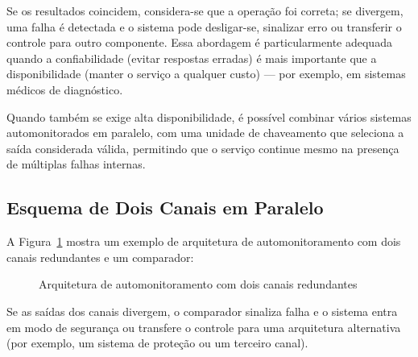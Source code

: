 \documentclass[12pt,a4paper]{report}
\begin{document}
Se os resultados coincidem, considera-se que a operação foi correta; se
divergem, uma falha é detectada e o sistema pode desligar-se, sinalizar
erro ou transferir o controle para outro componente. Essa abordagem é
particularmente adequada quando a confiabilidade (evitar respostas erradas)
é mais importante que a disponibilidade (manter o serviço a qualquer custo)
— por exemplo, em sistemas médicos de diagnóstico.

Quando também se exige alta disponibilidade, é possível combinar vários
sistemas automonitorados em paralelo, com uma unidade de chaveamento que
seleciona a saída considerada válida, permitindo que o serviço continue
mesmo na presença de múltiplas falhas internas.

\subsection{Esquema de Dois Canais em Paralelo}

A Figura~\ref{fig:automonitoramento} mostra um exemplo de arquitetura de
automonitoramento com dois canais redundantes e um comparador:

\begin{figure}[h]
    \centering
    \caption{Arquitetura de automonitoramento com dois canais redundantes}
    \label{fig:automonitoramento}
\end{figure}

Se as saídas dos canais divergem, o comparador sinaliza falha e o sistema
entra em modo de segurança ou transfere o controle para uma arquitetura
alternativa (por exemplo, um sistema de proteção ou um terceiro canal).
\end{document}

